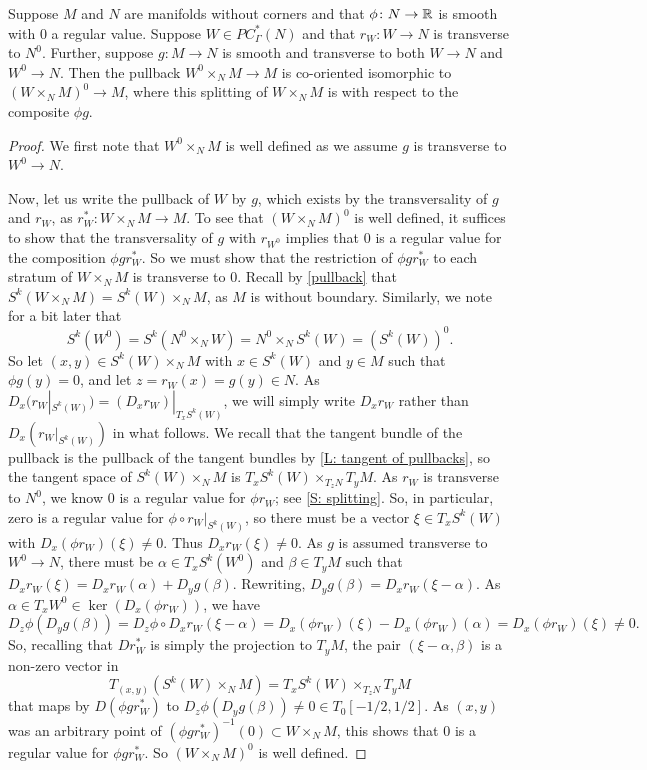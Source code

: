 \begin{lemma}\label{L: cut pullback}
	Suppose $M$ and $N$ are manifolds without corners and that $\phi \colon N \to \mathbb{R}$ is smooth with $0$ a regular value.
	Suppose $W \in PC^*_\Gamma(N)$ and that $r_W \colon W \to N$ is transverse to $N^0$.
	Further, suppose $g \colon M \to N$ is smooth and transverse to both $W \to N$ and $W^0 \to N$.
	Then the pullback $W^0 \times_N M \to M$ is co-oriented isomorphic to $(W \times_N M)^0 \to M$, where this splitting of $W \times_N M$ is with respect to the composite $\phi g$.
\end{lemma}

\begin{proof}
	We first note that $W^0 \times_N M$ is well defined as we assume $g$ is transverse to $W^0 \to N$.

	Now, let us write the pullback of $W$ by $g$, which exists by the transversality of $g$ and $r_W$, as $r_W^* \colon W \times_N M \to M$.
	To see that $(W \times_N M)^0$ is well defined, it suffices to show that the transversality of $g$ with $r_{W^0}$ implies that $0$ is a regular value for the composition $\phi g r_W^*$.
	So we must show that the restriction of $\phi gr_W^*$ to each stratum of $W \times_N M$ is transverse to $0$.
	Recall by \cref{pullback} that $S^k(W \times_N M) = S^k(W) \times_N M$, as $M$ is without boundary.
	Similarly, we note for a bit later that $$S^k(W^0) = S^k(N^0 \times_N W) = N^0 \times_N S^k(W) = (S^k(W))^0.$$
	So let $(x,y) \in S^k(W) \times_N M$ with $x \in S^k(W)$ and $y \in M$ such that $\phi g(y)=0$, and let $z = r_W(x) = g(y) \in N$.
	As $D_x(r_W|_{S^k(W)}) = (D_xr_W)|_{T_xS^k(W)}$, we will simply write $D_xr_W$ rather than $D_x(r_W|_{S^k(W)})$ in what follows.
	We recall that the tangent bundle of the pullback is the pullback of the tangent bundles by \cref{L: tangent of pullbacks}, so the tangent space of $S^k(W) \times_N M$ is $T_x S^k(W) \times_{T_{z}N} T_yM$.
	As $r_W$ is transverse to $N^0$, we know $0$ is a regular value for $\phi r_W$; see \cref{S: splitting}.
	So, in particular, zero is a regular value for $\phi \circ r_W|_{S^k(W)}$, so there must be a vector $\xi \in T_xS^k(W)$ with $D_x(\phi r_W)(\xi)\neq 0$.
	Thus $D_xr_W(\xi) \neq 0$.
	As $g$ is assumed transverse to $W^0 \to N$, there must be $\alpha \in T_xS^k(W^0)$ and $\beta \in T_yM$ such that $D_xr_W(\xi) = D_xr_W(\alpha) + D_yg (\beta)$.
	Rewriting, $D_yg (\beta) = D_xr_W(\xi-\alpha)$.
	As $\alpha \in T_xW^0 \in \ker(D_x (\phi r_W))$, we have $$D_{z}\phi(D_yg (\beta)) = D_{z}\phi \circ D_xr_W(\xi-\alpha) = D_x(\phi r_W)(\xi)-D_x(\phi r_W)(\alpha) = D_x(\phi r_W)(\xi)\neq 0.$$
	So, recalling that $Dr_W^*$ is simply the projection to $T_yM$, the pair $( \xi-\alpha, \beta)$ is a non-zero vector in $$T_{(x,y)}(S^k(W) \times_N M) = T_x S^k(W) \times_{T_{z}N} T_yM$$ that maps by $D(\phi gr_W^*)$ to $D_{z}\phi(D_yg (\beta)) \neq 0 \in T_{0}[-1/2, 1/2]$.
	As $(x,y)$ was an arbitrary point of $(\phi gr^*_{W})^{-1}(0) \subset W \times_N M$, this shows that $0$ is a regular value for $\phi gr^*_W$.
	So $(W \times_N M)^0$ is well defined.


\end{proof}

